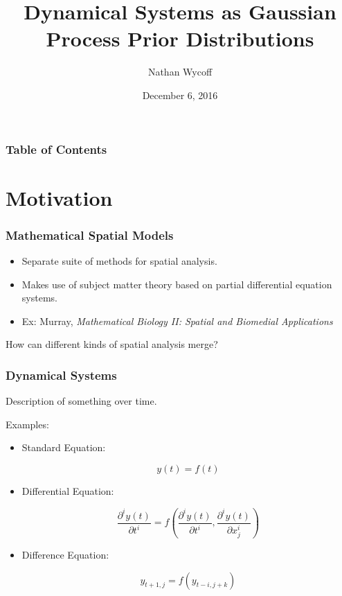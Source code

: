 \documentclass{beamer}
\title %
{Dynamical Systems as Gaussian Process \newline Prior  Distributions}
\author{Nathan Wycoff}
\institute[Virginia Tech] %
{
	Virginia Tech
}
\date{December 6, 2016}
\begin{document}
	\frame{\titlepage}
	
	\begin{frame}
		\frametitle{Table of Contents}
		\tableofcontents
	\end{frame}
	
	\section[Section]{Motivation}
	
	\begin{frame}
		\frametitle{Mathematical Spatial Models}
		
		\begin{itemize}
			\item Separate suite of methods for spatial analysis.
			\item Makes use of subject matter theory based on partial differential equation systems.
			\item Ex: Murray, \textit{Mathematical Biology II: Spatial and Biomedial Applications}
		\end{itemize}
		
		\vspace{1em}
		
		How can different kinds of spatial analysis merge?

		
		
	\end{frame}
	
	\begin{frame}
		\frametitle{Dynamical Systems}
		
		Description of something over time.
		
		
		\vspace{2em}
		
		Examples:
		
		\begin{itemize}
			\item Standard Equation:
			
			$$y(t) = f(t)$$
			
			\item Differential Equation:
			
			$$\frac{\partial^i y(t)}{\partial t^i} = f(\frac{\partial^i y(t)}{\partial t^i}, \frac{\partial^i y(t)}{\partial x_j^i})$$
			
			\item Difference Equation:
			
			$$y_{t+1, j} = f(y_{t-i,j+k})$$
			
		\end{itemize}
		
		
		
	\end{frame}
	
\end{document}
